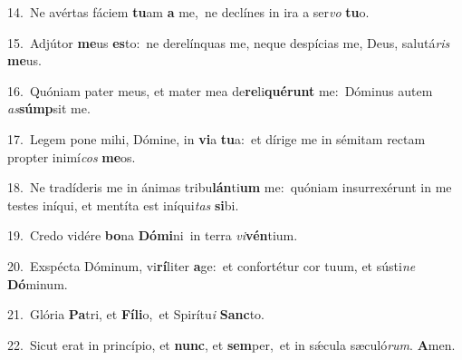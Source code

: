 {\numbfont\textcolor{\numbcolor}{14.}}~Ne avértas fáciem \textbf{tu}\-am \textbf{a} me,~\star ne declínes in ira a ser\textit{vo} \textbf{tu}\-o.\par
{\numbfont\textcolor{\numbcolor}{15.}}~Adjútor \textbf{me}\-us \textbf{es}\-to:~\star ne derelínquas me, neque despícias me, Deus, salutá\textit{ris} \textbf{me}\-us.\par
{\numbfont\textcolor{\numbcolor}{16.}}~Quóniam pater meus, et mater mea de\-\textbf{re}\-li\-\textbf{qué}\-\textbf{runt} me:~\star Dóminus autem \textit{as}\-\textbf{súmp}sit me.\par
{\numbfont\textcolor{\numbcolor}{17.}}~Legem pone mihi, Dómine, in \textbf{vi}\-a \textbf{tu}\-a:~\star et dírige me in sémitam rectam propter inimí\textit{cos} \textbf{me}\-os.\par
{\numbfont\textcolor{\numbcolor}{18.}}~Ne tradíderis me in ánimas tribu\-\textbf{lán}\-ti\textbf{um} me:~\star quóniam insurrexérunt in me testes iníqui, et mentíta est iníqui\textit{tas} \textbf{si}\-bi.\par
{\numbfont\textcolor{\numbcolor}{19.}}~Credo vidére \textbf{bo}\-na \textbf{Dó}\-\textbf{mi}ni~\star in terra \textit{vi}\-\textbf{vén}tium.\par
{\numbfont\textcolor{\numbcolor}{20.}}~Exspécta Dóminum, vi\-\textbf{rí}\-liter \textbf{a}\-ge:~\star et confortétur cor tuum, et sústi\textit{ne} \textbf{Dó}\-minum.\par
{\numbfont\textcolor{\numbcolor}{21.}}~Glória \textbf{Pa}\-tri, et \textbf{Fí}\-\textbf{li}o,~\star et Spirítu\textit{i} \textbf{Sanc}\-to.\par
{\numbfont\textcolor{\numbcolor}{22.}}~Sicut erat in princípio, et \textbf{nunc}\-, et \textbf{sem}\-per,~\star et in sǽcula sæculó\-\textit{rum}\-. \textbf{A}\-men.\par
